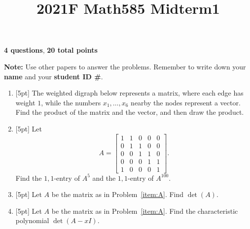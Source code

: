 \documentclass{article}
\title{2021F Math585 Midterm1}
\date{\vspace{-1cm}}
\begin{document}
\maketitle
\large

\textbf{4 questions}, \textbf{20 total points}

\textbf{Note:}  Use other papers to answer the problems.  Remember to write down your \textbf{name} and your \textbf{student ID \#}.

\begin{enumerate}
\setlength\itemsep{2em}

\item{} [5pt] The weighted digraph below represents a matrix, where each edge has weight $1$, while the numbers $x_1, \ldots, x_6$ nearby the nodes represent a vector.  Find the product of the matrix and the vector, and then draw the product.

\begin{center}
\end{center}

\item{} [5pt] Let  
\[
    A = \begin{bmatrix}
    1 & 1 & 0 & 0 & 0 \\
    0 & 1 & 1 & 0 & 0 \\
    0 & 0 & 1 & 1 & 0 \\
    0 & 0 & 0 & 1 & 1 \\
    1 & 0 & 0 & 0 & 1
    \end{bmatrix}.
\]
Find the $1,1$-entry of $A^5$ and the $1,1$-entry of $A^{100}$.  \label{item:A}

\item{} [5pt] Let $A$ be the matrix as in Problem~\ref{item:A}.  Find $\det(A)$.  

\item{} [5pt] Let $A$ be the matrix as in Problem~\ref{item:A}.  Find the characteristic polynomial $\det(A - xI)$.  




\end{enumerate}
\end{document}
